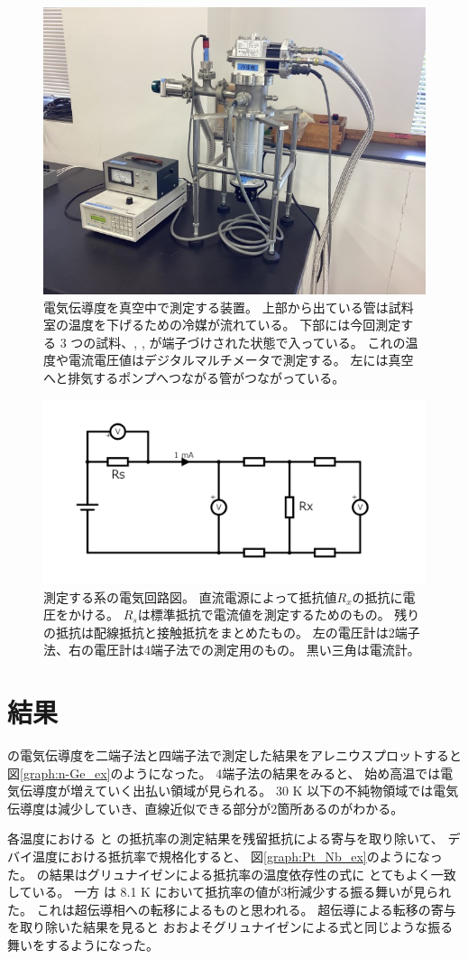 \documentclass[11pt,dvipdfmx,a4paper]{jsarticle}
\begin{document}
\begin{figure}[h]
	\centering
	\includegraphics[width=0.5\columnwidth]{pic/01.jpg}
	\caption{
		電気伝導度を真空中で測定する装置。
		上部から出ている管は試料室の温度を下げるための冷媒が流れている。
		下部には今回測定する 3 つの試料、, ,  が端子づけされた状態で入っている。
        これの温度や電流電圧値はデジタルマルチメータで測定する。
		左には真空へと排気するポンプへつながる管がつながっている。
	}
	\label{pic:measure_system}
\end{figure}
\begin{figure}[h]
	\centering
	\includegraphics[width=0.75\columnwidth]{fig/fig4.png}
	\caption{測定する系の電気回路図。
    直流電源によって抵抗値\(R_x\)の抵抗に電圧をかける。
    \(R_s\)は標準抵抗で電流値を測定するためのもの。
    残りの抵抗は配線抵抗と接触抵抗をまとめたもの。
    左の電圧計は2端子法、右の電圧計は4端子法での測定用のもの。
    黒い三角は電流計。
	}
	\label{fig:circuit_system}
\end{figure}

\clearpage
\section{結果}
 の電気伝導度を二端子法と四端子法で測定した結果をアレニウスプロットすると図\ref{graph:n-Ge_ex}のようになった。
4端子法の結果をみると、
始め高温では電気伝導度が増えていく出払い領域が見られる。
30 K 以下の不純物領域では電気伝導度は減少していき、直線近似できる部分が2箇所あるのがわかる。

各温度における  と  の抵抗率の測定結果を残留抵抗による寄与を取り除いて、
デバイ温度における抵抗率で規格化すると、
図\ref{graph:Pt_Nb_ex}のようになった。
 の結果はグリュナイゼン\cite{Grueneisen}による抵抗率の温度依存性の式に
とてもよく一致している。
一方  は 8.1 K において抵抗率の値が3桁減少する振る舞いが見られた。
これは超伝導相への転移によるものと思われる。
超伝導による転移の寄与を取り除いた結果を見ると
おおよそグリュナイゼンによる式と同じような振る舞いをするようになった。
\end{document}
